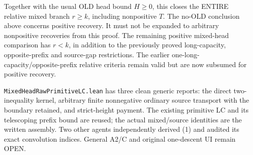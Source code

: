 Together with the usual OLD head bound $H\ge0$, this closes the
ENTIRE relative mixed branch $r\ge k$, including nonpositive $T$.
The no-OLD conclusion above concerns positive recovery. It must not
be expanded to arbitrary nonpositive recoveries from this proof.
The remaining positive mixed-head comparison has $r<k$, in addition to
the previously proved long-capacity, opposite-prefix and source-gap
restrictions. The earlier one-long-capacity/opposite-prefix relative
criteria remain valid but are now subsumed for positive recovery.

\texttt{MixedHeadRawPrimitiveLC.lean} has three clean generic reports:
the direct two-inequality kernel, arbitrary finite nonnegative ordinary
source transport with the boundary retained, and strict-height payment.
The existing primitive LC and its telescoping prefix bound are reused;
the actual mixed/source identities are the written assembly.
Two other agents independently derived (1) and audited its exact
convolution indices. General A2/C and original one-descent UI remain OPEN.
